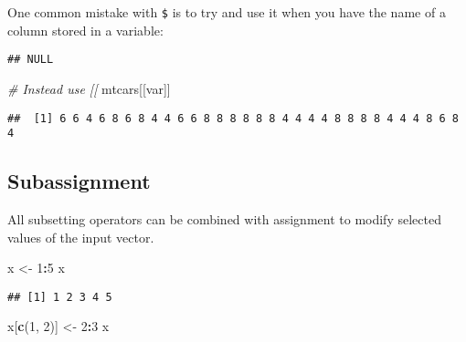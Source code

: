 \documentclass[
]{book}
\newenvironment{Shaded}{\begin{snugshade}}{\end{snugshade}}
\newcommand{\CommentTok}[1]{\textcolor[rgb]{0.56,0.35,0.01}{\textit{#1}}}
\newcommand{\DecValTok}[1]{\textcolor[rgb]{0.00,0.00,0.81}{#1}}
\newcommand{\KeywordTok}[1]{\textcolor[rgb]{0.13,0.29,0.53}{\textbf{#1}}}
\newcommand{\NormalTok}[1]{#1}
\newcommand{\OperatorTok}[1]{\textcolor[rgb]{0.81,0.36,0.00}{\textbf{#1}}}
\newcommand{\StringTok}[1]{\textcolor[rgb]{0.31,0.60,0.02}{#1}}
\begin{document}
One common mistake with \texttt{\$} is to try and use it when you have the name of a column stored in a variable:

\begin{Shaded}
\end{Shaded}

\begin{verbatim}
## NULL
\end{verbatim}

\begin{Shaded}
\begin{Highlighting}[]
\CommentTok{\# Instead use [[}
\NormalTok{mtcars[[var]]}
\end{Highlighting}
\end{Shaded}

\begin{verbatim}
##  [1] 6 6 4 6 8 6 8 4 4 6 6 8 8 8 8 8 8 4 4 4 4 8 8 8 8 4 4 4 8 6 8 4
\end{verbatim}

\hypertarget{subassignment}{%
\subsection{Subassignment}\label{subassignment}}

All subsetting operators can be combined with assignment to modify selected values of the input vector.

\begin{Shaded}
\begin{Highlighting}[]
\NormalTok{x \textless{}{-}}\StringTok{ }\DecValTok{1}\OperatorTok{:}\DecValTok{5}
\NormalTok{x}
\end{Highlighting}
\end{Shaded}

\begin{verbatim}
## [1] 1 2 3 4 5
\end{verbatim}

\begin{Shaded}
\begin{Highlighting}[]
\NormalTok{x[}\KeywordTok{c}\NormalTok{(}\DecValTok{1}\NormalTok{, }\DecValTok{2}\NormalTok{)] \textless{}{-}}\StringTok{ }\DecValTok{2}\OperatorTok{:}\DecValTok{3}
\NormalTok{x}
\end{Highlighting}
\end{Shaded}
\end{document}
